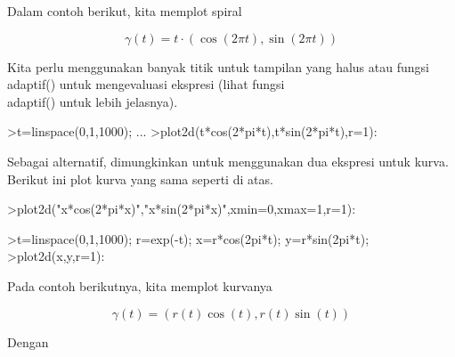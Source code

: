 \documentclass{article}
\begin{document}
\begin{eulernotebook}
\begin{eulercomment}
\begin{eulercomment}
\begin{eulercomment}
\begin{eulercomment}
\begin{eulercomment}
\begin{eulercomment}
\begin{eulercomment}
Dalam  contoh  berikut,  kita  memplot  spiral

\end{eulercomment}
\begin{eulerformula}
\[
\gamma(t) = t \cdot (\cos(2\pi t),\sin(2\pi t))
\]
\end{eulerformula}
\begin{eulercomment}
Kita  perlu  menggunakan  banyak  titik  untuk  tampilan  yang  halus
atau  fungsi  adaptif()  untuk  mengevaluasi  ekspresi  (lihat  fungsi\\
adaptif()  untuk  lebih  jelasnya).
\end{eulercomment}
\begin{eulerprompt}
>t=linspace(0,1,1000); ...
>plot2d(t*cos(2*pi*t),t*sin(2*pi*t),r=1):
\end{eulerprompt}
\begin{eulercomment}
Sebagai  alternatif,  dimungkinkan  untuk  menggunakan  dua  ekspresi
untuk  kurva.  Berikut  ini  plot  kurva  yang  sama  seperti  di
atas.
\end{eulercomment}
\begin{eulerprompt}
>plot2d("x*cos(2*pi*x)","x*sin(2*pi*x)",xmin=0,xmax=1,r=1):
\end{eulerprompt}
\begin{eulerprompt}
>t=linspace(0,1,1000); r=exp(-t); x=r*cos(2pi*t); y=r*sin(2pi*t);
>plot2d(x,y,r=1):
\end{eulerprompt}
\begin{eulercomment}
Pada  contoh  berikutnya,  kita  memplot  kurvanya

\end{eulercomment}
\begin{eulerformula}
\[
\gamma(t) = (r(t) \cos(t), r(t) \sin(t))
\]
\end{eulerformula}
\begin{eulercomment}
Dengan


\end{eulercomment}
\end{eulercomment}
\end{eulercomment}
\end{eulercomment}
\end{eulercomment}
\end{eulercomment}
\end{eulercomment}
\end{eulernotebook}
\end{document}
